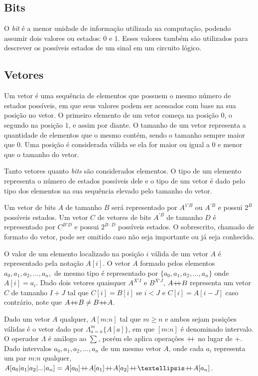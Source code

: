 \subsection{Bits}
\label{sec:bit}

  O \emph{bit} é a menor unidade de informação utilizada na computação, podendo assumir 
  dois valores ou estados: $0$ e $1$. Esses valores também são utilizados para descrever 
  os possíveis estados de um sinal em um circuito lógico.

\subsection{Vetores}
\label{sec:vec}

  Um vetor é uma sequência de elementos que possuem o mesmo número de estados possíveis, 
  em que seus valores podem ser acessados com base na sua posição no vetor. 
  O primeiro elemento de um vetor começa na posição $0$, o segundo na posição $1$,
  e assim por diante. O tamanho de um vetor representa a quantidade de elementos que o mesmo contém,
  sendo o tamanho sempre maior que $0$. Uma posição é considerada válida se ela for maior ou igual a $0$ e 
  menor que o tamanho do vetor.

  Tanto vetores quanto \emph{bits} são considerados elementos. O tipo de um elemento 
  representa o número de estados possíveis dele e o tipo de um vetor é dado pelo tipo 
  dos elementos na sua sequência elevado pelo tamanho do vetor.

  Um vetor de bits $A$ de tamanho $B$ será representado por $A^{1'B}$ ou $A^{'B}$ e 
  possui $2^B$ possíveis estados. Um vetor $C$ de vetores de bits $A^{'B}$ de tamanho
  $D$ é representado por $C^{B'D}$ e possui $2^{B \cdot D}$ possíveis estados. 
  O sobrescrito, chamado de formato do vetor, pode ser omitido caso não seja importante
  ou já seja conhecido.

  O valor de um elemento localizado na posição $i$ válida de um vetor $A$ é representado 
  pela notação $A[i]$. O vetor $A$ formado pelos elementos $a_0, a_1, a_2,..., a_n,$ 
  de mesmo tipo é representado por $\{a_0, a_1, a_2,..., a_n\}$ onde $A[i] = a_i$.
  Dado dois vetores quaisquer $A^{X'I}$ e $B^{X'J}$, $A {+\!\!+} B$ representa um vetor $C$ 
  de tamanho $I + J$ tal que $C[i] = B[i]$ se $i < J$ e $C[i] = A[i-J]$ caso contrário,
  note que $ A {+\!\!+} B \neq B {+\!\!+} A $.

  Dado um vetor $A$ qualquer, $A[m\text{:}n]$ tal que $m \geq n$ e ambos sejam posições
  válidas é o vetor dado por $\Lambda_{a = n}^m{\{A[a]\}}$, em que $[m\text{:}n]$ é denominado 
  intervalo.
  O operador $\Lambda$ é análogo ao $\textstyle \sum$, porém ele aplica operações $ +\!\!+ $ no lugar de $+$.
  Dado intervalos $a_0, a_1, a_2,..., a_n$ de um mesmo vetor $A$, onde cada $a_i$ representa um par $m\text{:}n$ qualquer, $A[a_0|a_1|a_2|...|a_n] 
  = A[a_0] \mdp A[a_1] \mdp A[a_2] \mdp … \mdp A[a_n]$.

